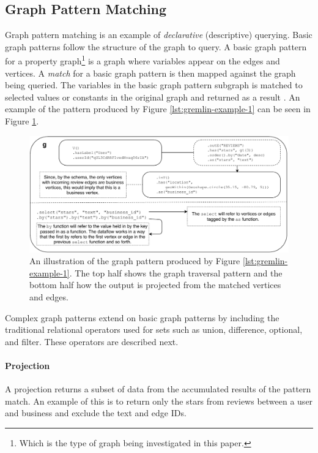 \subsection{Graph Pattern Matching}

Graph pattern matching is an example of \emph{declarative} (descriptive) querying. Basic graph patterns follow the structure of the graph to query. A basic graph pattern for a property graph\footnote{Which is the type of graph being investigated in this paper.} is a graph where variables appear on the edges and vertices. A \emph{match} for a basic graph pattern is then mapped against the graph being queried. The variables in the basic graph pattern subgraph is matched to selected values or constants in the original graph and returned as a result \cite{foundations-of-modern-gql}. An example of the pattern produced by Figure \ref{lst:gremlin-example-1} can be seen in Figure \ref{fig:gremlin-pattern}.

\begin{figure}[h]
    \centering
    \includegraphics[width=14cm]{img/gremlin-pattern.pdf}
    \caption{An illustration of the graph pattern produced by Figure \ref{lst:gremlin-example-1}. The top half shows the graph traversal pattern and the bottom half how the output is projected from the matched vertices and edges.}
    \label{fig:gremlin-pattern}
\end{figure}

Complex graph patterns extend on basic graph patterns by including the traditional relational operators used for sets such as union, difference, optional, and filter. These operators are described next.

\paragraph{Projection} A projection returns a subset of data from the accumulated results of the pattern match. An example of this is to return only the stars from reviews between a user and business and exclude the text and edge IDs.

